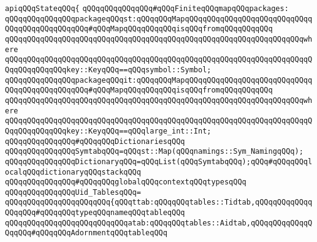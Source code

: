 \verb|apiqQQqStateqQQq{|\newline
\newline
\verb|qQQqqQQqqQQqqQQq#qQQqFiniteqQQqmapqQQqpackages:|\newline
\newline
\verb|qQQqqQQqqQQqqQQqpackageqQQqst:qQQqqQQqMapqQQqqQQqqQQqqQQqqQQqqQQqqQQqqQQqqQQqqQQqqQQqqQQq#qQQqMapqQQqqQQqqQQqisqQQqfromqQQqqQQqqQQq|\newline
\verb|qQQqqQQqqQQqqQQqqQQqqQQqqQQqqQQqqQQqqQQqqQQqqQQqqQQqqQQqqQQqqQQqqQQqwhere|\newline
\verb|qQQqqQQqqQQqqQQqqQQqqQQqqQQqqQQqqQQqqQQqqQQqqQQqqQQqqQQqqQQqqQQqqQQqqQQqqQQqqQQqqQQqkey::KeyqQQq==qQQqsymbol::Symbol;|\newline
\newline
\verb|qQQqqQQqqQQqqQQqpackageqQQqit:qQQqqQQqMapqQQqqQQqqQQqqQQqqQQqqQQqqQQqqQQqqQQqqQQqqQQqqQQq#qQQqMapqQQqqQQqqQQqisqQQqfromqQQqqQQqqQQq|\newline
\verb|qQQqqQQqqQQqqQQqqQQqqQQqqQQqqQQqqQQqqQQqqQQqqQQqqQQqqQQqqQQqqQQqqQQqwhere|\newline
\verb|qQQqqQQqqQQqqQQqqQQqqQQqqQQqqQQqqQQqqQQqqQQqqQQqqQQqqQQqqQQqqQQqqQQqqQQqqQQqqQQqqQQqkey::KeyqQQq==qQQqlarge_int::Int;|\newline
\newline
\newline
\verb|qQQqqQQqqQQqqQQq#qQQqqQQqDictionariesqQQq|\newline
\newline
\verb|qQQqqQQqqQQqqQQqSymtabqQQq=qQQqst::Map(qQQqnamings::Sym_NamingqQQq);|\newline
\verb|qQQqqQQqqQQqqQQqDictionaryqQQq=qQQqList(qQQqSymtabqQQq);qQQq#qQQqqQQqlocalqQQqdictionaryqQQqstackqQQq|\newline
\newline
\newline
\verb|qQQqqQQqqQQqqQQq#qQQqqQQqglobalqQQqcontextqQQqtypesqQQq|\newline
\newline
\verb|qQQqqQQqqQQqqQQqUid_TablesqQQq=|\newline
\verb|qQQqqQQqqQQqqQQqqQQqqQQq{qQQqttab:qQQqqQQqtables::Tidtab,qQQqqQQqqQQqqQQqqQQq#qQQqqQQqtypeqQQqnameqQQqtableqQQq|\newline
\verb|qQQqqQQqqQQqqQQqqQQqqQQqqQQqatab:qQQqqQQqtables::Aidtab,qQQqqQQqqQQqqQQqqQQq#qQQqqQQqAdornmentqQQqtableqQQq|\newline
